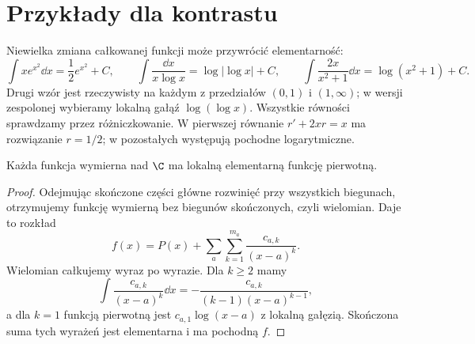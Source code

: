 \section{Przykłady dla kontrastu}

Niewielka zmiana całkowanej funkcji może przywrócić elementarność:
\[
\int x e^{x^2}\dd x=\frac12e^{x^2}+C,\qquad
\int\frac{\dd x}{x\log x}=\log|\log x|+C,
\qquad
\int\frac{2x}{x^2+1}\dd x=\log(x^2+1)+C.
\]
Drugi wzór jest rzeczywisty na każdym z przedziałów $(0,1)$ i $(1,\infty)$; w wersji zespolonej wybieramy lokalną gałąź $\log(\log x)$. Wszystkie równości sprawdzamy przez różniczkowanie. W pierwszej równanie $r'+2xr=x$ ma rozwiązanie $r=1/2$; w pozostałych występują pochodne logarytmiczne.

\begin{twierdzenie}
Każda funkcja wymierna nad $\C$ ma lokalną elementarną funkcję pierwotną.
\end{twierdzenie}
\begin{proof}
Odejmując skończone części główne rozwinięć przy wszystkich biegunach, otrzymujemy funkcję wymierną bez biegunów skończonych, czyli wielomian. Daje to rozkład
\[
f(x)=P(x)+\sum_a\sum_{k=1}^{m_a}\frac{c_{a,k}}{(x-a)^k}.
\]
Wielomian całkujemy wyraz po wyrazie. Dla $k\ge2$ mamy
\[
\int\frac{c_{a,k}}{(x-a)^k}\dd x
=-\frac{c_{a,k}}{(k-1)(x-a)^{k-1}},
\]
a dla $k=1$ funkcją pierwotną jest $c_{a,1}\log(x-a)$ z lokalną gałęzią. Skończona suma tych wyrażeń jest elementarna i ma pochodną $f$.
\end{proof}


